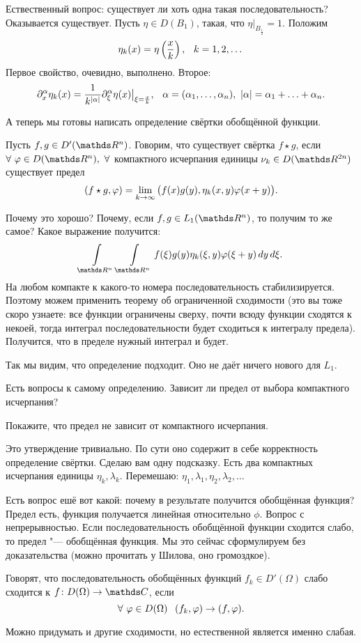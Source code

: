 Ествественный вопрос: существует ли хоть одна такая последовательность? Оказывается существует. Пусть $\eta\in D(B_1)$, такая, что $\eta\big|_{B_{\frac12}} = 1$. Положим
\[\eta_k(x) = \eta\left(\frac xk\right),\pau k=1,2,\dots\]
Первое свойство, очевидно, выполнено. Второе:
\[\partial_x^\alpha\eta_k(x) = \frac1{k^{|\alpha|}}\partial_\xi^\alpha\eta(x)\big|_{\xi = \frac xk},\hskip .75em plus.1em minus.08em\relax \alpha = (\alpha_1,\dots,\alpha_n),\ |\alpha| =\alpha_1+\ldots+\alpha_n.\]

А теперь мы готовы написать определение свёртки обобщённой функции.
\begin{Def}
  Пусть $f,g\in D'(\R^n)$. Говорим, что существует свёртка $f\star g$, если $\forall\ \phi\in D(\R^n),\ \forall$ компактного исчерпания единицы $\nu_k\in D(\R^{2n})$ существует предел
\[
  (f\star g,\varphi) = \lim\limits_{k\rightarrow\infty}\big( f(x)g(y),\eta_k(x,y)\varphi(x+y)\big).
\]
\end{Def}

Почему это хорошо? Почему, если $f,g\in L_1(\R^n)$, то получим то же самое? Какое выражение получится:
\[\Gint{\R^n}\Gint{\R^n} f(\xi)g(y)\eta_k(\xi,y)\phi(\xi+y)\,dy\,d\xi.\]
На любом компакте к какого-то номера последовательность стабилизируется. Поэтому можем применить теорему об ограниченной сходимости (это вы тоже скоро узнаете: все функции ограничены сверху, почти всюду функции сходятся к некоей, тогда интеграл последовательности будет сходиться к интегралу предела). Получится, что в пределе нужный интеграл и будет.

Так мы видим, что определение подходит. Оно не даёт ничего нового для $L_1$.

Есть вопросы к самому определению. Зависит ли предел от выбора компактного исчерпания?
\begin{Task}
  Покажите, что предел не зависит от компактного исчерпания.
\end{Task}
Это утверждение тривиально. По сути оно содержит в себе корректность определение свёртки. Сделаю вам одну подсказку. Есть два компактных исчерпания единицы $\eta_k,\lambda_k$. Перемешаю: $\eta_1,\lambda_1,\eta_2,\lambda_2,\dots$

Есть вопрос ешё вот какой: почему в результате получится обобщённая функция? Предел есть, функция получается линейная относительно $\phi$. Вопрос с непрерывностью. Если последовательность обобщённой функции сходится слабо, то предел "--- обобщённая функция. Мы это сейчас сформулируем без доказательства (можно прочитать у Шилова, оно громоздкое).
\begin{Def}
  Говорят, что последовательность обобщённых функций $f_k\in D'(\Omega)$ слабо сходится к $f\colon D(\Omega)\to \C$, если 
  \[
     \forall\ \varphi\in D(\Omega)\hskip .75em plus.1em minus.08em\relax (f_k,\varphi)\rightarrow (f,\varphi).
  \]
\end{Def}
Можно придумать и другие сходимости, но естественной является именно слабая.

